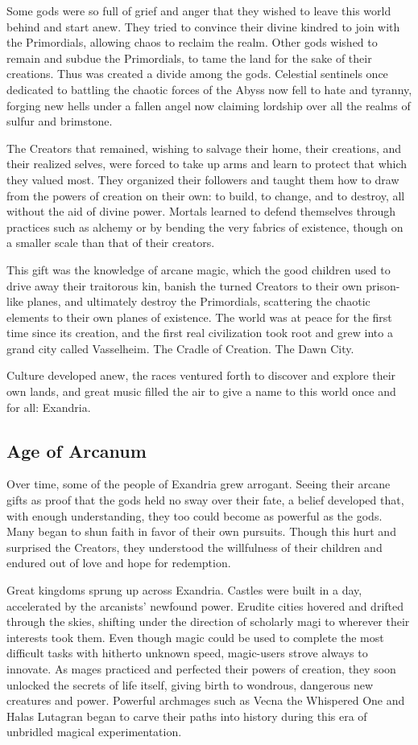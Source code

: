 \documentclass[10pt,a4paper,twoside,bg=print,twocolumn,openany,nodeprecatedcode]{dndbook}
\begin{document}
Some gods were so full of grief and anger that they wished to leave this world behind and start anew. They tried to convince their divine kindred to join with the Primordials, allowing chaos to reclaim the realm. Other gods wished to remain and subdue the Primordials, to tame the land for the sake of their creations. Thus was created a divide among the gods. Celestial sentinels once dedicated to battling the chaotic forces of the Abyss now fell to hate and tyranny, forging new hells under a fallen angel now claiming lordship over all the realms of sulfur and brimstone.

The Creators that remained, wishing to salvage their home, their creations, and their realized selves, were forced to take up arms and learn to protect that which they valued most. They organized their followers and taught them how to draw from the powers of creation on their own: to build, to change, and to destroy, all without the aid of divine power. Mortals learned to defend themselves through practices such as alchemy or by bending the very fabrics of existence, though on a smaller scale than that of their creators.

This gift was the knowledge of arcane magic, which the good children used to drive away their traitorous kin, banish the turned Creators to their own prison-like planes, and ultimately destroy the Primordials, scattering the chaotic elements to their own planes of existence. The world was at peace for the first time since its creation, and the first real civilization took root and grew into a grand city called Vasselheim. The Cradle of Creation. The Dawn City.

Culture developed anew, the races ventured forth to discover and explore their own lands, and great music filled the air to give a name to this world once and for all: Exandria.

\subsection{Age of Arcanum}
Over time, some of the people of Exandria grew arrogant. Seeing their arcane gifts as proof that the gods held no sway over their fate, a belief developed that, with enough understanding, they too could become as powerful as the gods. Many began to shun faith in favor of their own pursuits. Though this hurt and surprised the Creators, they understood the willfulness of their children and endured out of love and hope for redemption.

Great kingdoms sprung up across Exandria. Castles were built in a day, accelerated by the arcanists' newfound power. Erudite cities hovered and drifted through the skies, shifting under the direction of scholarly magi to wherever their interests took them. Even though magic could be used to complete the most difficult tasks with hitherto unknown speed, magic-users strove always to innovate. As mages practiced and perfected their powers of creation, they soon unlocked the secrets of life itself, giving birth to wondrous, dangerous new creatures and power. Powerful archmages such as Vecna the Whispered One and Halas Lutagran began to carve their paths into history during this era of unbridled magical experimentation.
\end{document}
